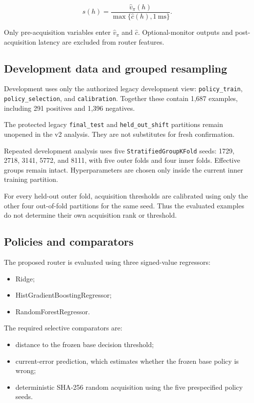 \documentclass[11pt]{article}
\newcommand{\code}[1]{\texttt{#1}}
\newcommand{\DevelopmentN}{1,687}
\newcommand{\DevelopmentPositive}{291}
\newcommand{\DevelopmentNegative}{1,396}
\begin{document}
\[
s(h)
=
\frac{
\widehat v_{\pi}(h)
}{
\max\{
\widehat c(h),1\ \mathrm{ms}
\}
}.
\]

Only pre-acquisition variables enter
\(\widehat v_{\pi}\) and \(\widehat c\). Optional-monitor outputs
and post-acquisition latency are excluded from router features.

\subsection{Development data and grouped resampling}

Development uses only the authorized legacy development view:
\code{policy\_train}, \code{policy\_selection}, and
\code{calibration}. Together these contain
\DevelopmentN{} examples, including
\DevelopmentPositive{} positives and
\DevelopmentNegative{} negatives.

The protected legacy \code{final\_test} and
\code{held\_out\_shift} partitions remain unopened in the v2
analysis. They are not substitutes for fresh confirmation.

Repeated development analysis uses five
\code{StratifiedGroupKFold} seeds:
1729, 2718, 3141, 5772, and 8111, with five outer folds and four
inner folds. Effective groups remain intact. Hyperparameters are
chosen only inside the current inner training partition.

For every held-out outer fold, acquisition thresholds are
calibrated using only the other four out-of-fold partitions for the
same seed. Thus the evaluated examples do not determine their own
acquisition rank or threshold.

\subsection{Policies and comparators}

The proposed router is evaluated using three signed-value
regressors:

\begin{itemize}
\item Ridge;
\item HistGradientBoostingRegressor;
\item RandomForestRegressor.
\end{itemize}

The required selective comparators are:

\begin{itemize}
\item distance to the frozen base decision threshold;
\item current-error prediction, which estimates whether the frozen
base policy is wrong;
\item deterministic SHA-256 random acquisition using the five
prespecified policy seeds.
\end{itemize}
\end{document}
